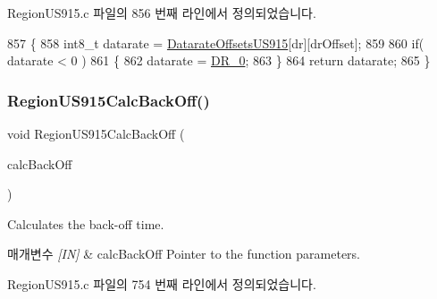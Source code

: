 Region\+U\+S915.\+c 파일의 856 번째 라인에서 정의되었습니다.


\begin{DoxyCode}
857 \{
858     int8\_t datarate = \mbox{\hyperlink{group___r_e_g_i_o_n_u_s915_ga0eb65060b81a140baf62758bd288d073}{DatarateOffsetsUS915}}[dr][drOffset];
859 
860     \textcolor{keywordflow}{if}( datarate < 0 )
861     \{
862         datarate = \mbox{\hyperlink{group___r_e_g_i_o_n_ga6c4ef966b4f3d5eb7597b087f2b97095}{DR\_0}};
863     \}
864     \textcolor{keywordflow}{return} datarate;
865 \}
\end{DoxyCode}
\mbox{\label{group___r_e_g_i_o_n_u_s915_ga134edad7c2c6d4c2a063b08b6358b8be}} 
\subsubsection{\texorpdfstring{Region\+U\+S915\+Calc\+Back\+Off()}{RegionUS915CalcBackOff()}}
{\footnotesize\ttfamily void Region\+U\+S915\+Calc\+Back\+Off (\begin{DoxyParamCaption}\item[{\mbox{\hyperlink{group___r_e_g_i_o_n_ga7c5c9a8da174e6679eded8257dc92fd9}{Calc\+Back\+Off\+Params\+\_\+t}} $\ast$}]{calc\+Back\+Off }\end{DoxyParamCaption})}



Calculates the back-\/off time. 


\begin{DoxyParams}{매개변수}
{\em \mbox{[}\+I\+N\mbox{]}} & calc\+Back\+Off Pointer to the function parameters. \\
\hline
\end{DoxyParams}


Region\+U\+S915.\+c 파일의 754 번째 라인에서 정의되었습니다.


